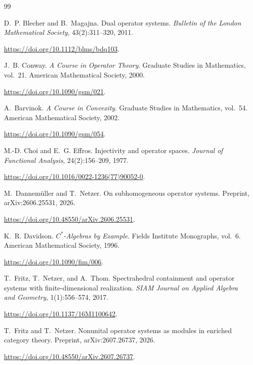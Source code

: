 \documentclass[11pt,onecolumn]{article}
\theoremstyle{plain}
\theoremstyle{definition}
\begin{document}
\begin{thebibliography}{99}

D.~P. Blecher and B.~Magajna.
\newblock Dual operator systems.
\newblock \emph{Bulletin of the London Mathematical Society}, 43(2):311--320, 2011.

\newblock \url{https://doi.org/10.1112/blms/bdq103}.

J.~B. Conway.
\newblock \emph{A Course in Operator Theory}.
\newblock Graduate Studies in Mathematics, vol.~21. American Mathematical Society, 2000.

\newblock \url{https://doi.org/10.1090/gsm/021}.

A.~Barvinok.
\newblock \emph{A Course in Convexity}.
\newblock Graduate Studies in Mathematics, vol.~54. American Mathematical Society, 2002.

\newblock \url{https://doi.org/10.1090/gsm/054}.

M.-D. Choi and E.~G. Effros.
\newblock Injectivity and operator spaces.
\newblock \emph{Journal of Functional Analysis}, 24(2):156--209, 1977.

\newblock \url{https://doi.org/10.1016/0022-1236(77)90052-0}.


M.~Dannem\"uller and T.~Netzer.
\newblock On subhomogeneous operator systems.
\newblock Preprint, arXiv:2606.25531, 2026.

\newblock \url{https://doi.org/10.48550/arXiv.2606.25531}.

K.~R. Davidson.
\newblock \emph{$C^*$-Algebras by Example}.
\newblock Fields Institute Monographs, vol.~6. American Mathematical Society, 1996.

\newblock \url{https://doi.org/10.1090/fim/006}.

T.~Fritz, T.~Netzer, and A.~Thom.
\newblock Spectrahedral containment and operator systems with finite-dimensional realization.
\newblock \emph{SIAM Journal on Applied Algebra and Geometry}, 1(1):556--574, 2017.

\newblock \url{https://doi.org/10.1137/16M1100642}.

T.~Fritz and T.~Netzer.
\newblock Nonunital operator systems as modules in enriched category theory.
\newblock Preprint, arXiv:2607.26737, 2026.

\newblock \url{https://doi.org/10.48550/arXiv.2607.26737}.


\end{thebibliography}
\end{document}
